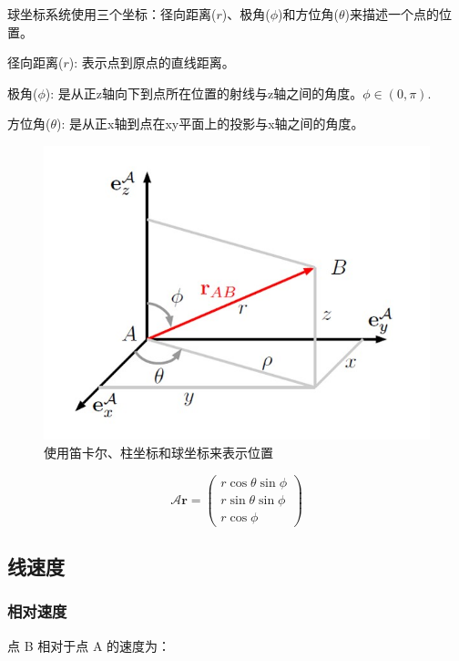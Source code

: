 \documentclass[11pt]{ctexart}
\begin{document}
球坐标系统使用三个坐标：径向距离($r$)、极角($\phi$)和方位角($\theta$)来描述一个点的位置。

径向距离($r$): 表示点到原点的直线距离。

极角($\phi$): 是从正z轴向下到点所在位置的射线与z轴之间的角度。$\phi\in (0,\pi)$.  

方位角($\theta$): 是从正x轴到点在xy平面上的投影与x轴之间的角度。


\begin{figure}[ht]
    \centering
    \includegraphics{images/1.jpg}
    \caption{ 使用笛卡尔、柱坐标和球坐标来表示位置}
    \label{label1}
\end{figure}

\begin{equation}
    \left.\mathcal{A}\mathbf{r}=\left(\begin{array}{c}r\cos\theta\sin\phi\\r\sin\theta\sin\phi\\r\cos\phi\end{array}\right.\right)
\end{equation}




\subsection{线速度}


\subsubsection{相对速度}
点 B 相对于点 A 的速度为：
\end{document}
